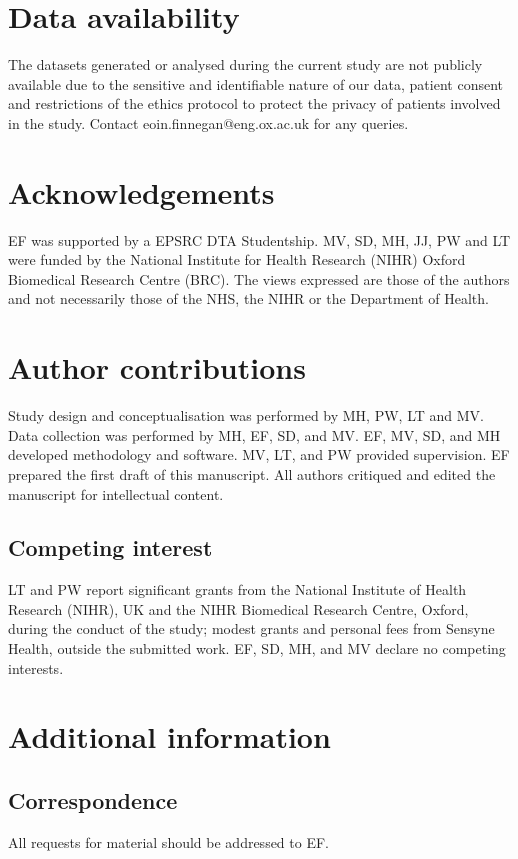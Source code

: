 \documentclass[fleqn,10pt]{wlscirep}
\begin{document}
\section*{Data availability}
The datasets generated or analysed during the current study are not publicly available due to the sensitive and identifiable nature of our data, patient consent and restrictions of the ethics protocol to protect the privacy of patients involved in the study. Contact eoin.finnegan@eng.ox.ac.uk for any queries. 






\section*{Acknowledgements}
EF was supported by a EPSRC DTA Studentship. MV, SD, MH, JJ, PW and LT were funded by the National Institute for Health Research (NIHR) Oxford Biomedical Research Centre (BRC). The views expressed are those of the authors and not necessarily those of the NHS, the NIHR or the Department of Health.


\section*{Author contributions}

Study design and conceptualisation was performed by MH, PW, LT and MV.
Data collection was performed by MH, EF, SD, and MV.
EF, MV, SD, and MH developed methodology and software.
MV, LT, and PW provided supervision. 
EF prepared the first draft of this manuscript.
All authors critiqued and edited the manuscript for intellectual content.

\subsection*{Competing interest}

LT and PW report significant grants from the National Institute of Health Research (NIHR), UK and the NIHR Biomedical Research Centre, Oxford, during the conduct of the study; modest grants and personal fees from Sensyne Health, outside the submitted work. EF, SD, MH, and MV declare no competing interests.

\section*{Additional information}



\subsection*{Correspondence} All requests for material should be addressed to EF.
\end{document}
